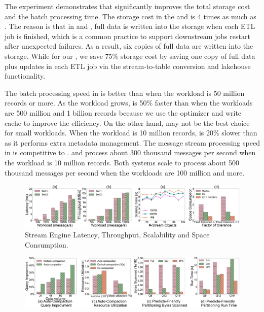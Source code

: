 The experiment demonstrates that \sys significantly improves the total storage cost and the batch processing time. The storage cost in the \hdfs and \kafka  is 4 times as much as \sys. The reason is that in \hdfs and \kafka, full data is written into the storage when each ETL job is finished, which is a common practice to support downstream jobs restart after unexpected failures. As a result, six copies of full data are written into the storage. 
While for our \sys, we save 75\%  storage cost by saving one copy of full data plus updates in each ETL job via the stream-to-table conversion and lakehouse functionality.

The batch processing speed in \sys is better than \hdfs when the workload is 50 million records or more.  As the workload grows,  \sys is 50\% faster than \hdfs when the workloads are 500 million and 1 billion records because we use the \brain optimizer and  write cache to improve the efficiency.
 On the other hand, \sys may not be the best choice for small workloads. When the workload is 10 million records, \sys is 20\% slower than \hdfs as it performs extra metadata management.
The message stream processing speed in \sys is competitive to \kafka. \sys and \kafka process about 300 thousand messages per second when the workload is 10 million records. Both systems scale to process about 500 thousand messages per second when the workloads are 100 million and more. 

\begin{figure}
	\centering
	\includegraphics[width=\textwidth]{figures/streamengine}
	\caption{Stream Engine Latency, Throughput, Scalability and Space Consumption.}
	\label{fig:streamengine}
\end{figure}



\begin{figure}
	\centering
	\includegraphics[width=\textwidth]{figures/LakeBrain}
	\caption{}
	\label{fig:lakebrain}
\end{figure}


